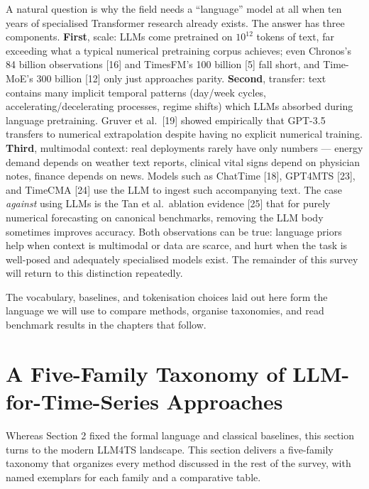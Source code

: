 \documentclass{article}
\begin{document}
A natural question is why the field needs a ``language'' model at all when ten years of specialised Transformer research already exists. The answer has three components. \textbf{First}, scale: LLMs come pretrained on \(10^{12}\) tokens of text, far exceeding what a typical numerical pretraining corpus achieves; even Chronos's 84 billion observations {[}16{]} and TimesFM's 100 billion {[}5{]} fall short, and Time-MoE's 300 billion {[}12{]} only just approaches parity. \textbf{Second}, transfer: text contains many implicit temporal patterns (day/week cycles, accelerating/decelerating processes, regime shifts) which LLMs absorbed during language pretraining. Gruver et al.~{[}19{]} showed empirically that GPT-3.5 transfers to numerical extrapolation despite having no explicit numerical training. \textbf{Third}, multimodal context: real deployments rarely have only numbers --- energy demand depends on weather text reports, clinical vital signs depend on physician notes, finance depends on news. Models such as ChatTime {[}18{]}, GPT4MTS {[}23{]}, and TimeCMA {[}24{]} use the LLM to ingest such accompanying text. The case \emph{against} using LLMs is the Tan et al.~ablation evidence {[}25{]} that for purely numerical forecasting on canonical benchmarks, removing the LLM body sometimes improves accuracy. Both observations can be true: language priors help when context is multimodal or data are scarce, and hurt when the task is well-posed and adequately specialised models exist. The remainder of this survey will return to this distinction repeatedly.

The vocabulary, baselines, and tokenisation choices laid out here form the language we will use to compare methods, organise taxonomies, and read benchmark results in the chapters that follow.

\section{A Five-Family Taxonomy of LLM-for-Time-Series Approaches}\label{a-five-family-taxonomy-of-llm-for-time-series-approaches}

Whereas Section 2 fixed the formal language and classical baselines, this section turns to the modern LLM4TS landscape. This section delivers a five-family taxonomy that organizes every method discussed in the rest of the survey, with named exemplars for each family and a comparative table.
\end{document}
